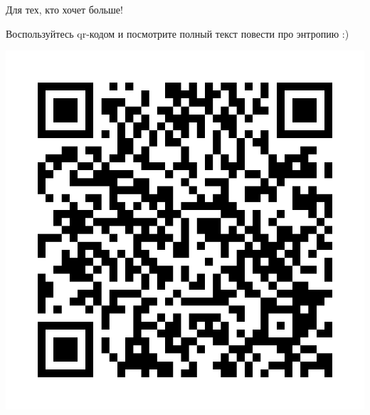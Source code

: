 \documentclass[final]{beamer}
\newlength{\onecolwid}
\begin{document}
\begin{frame}[t]
\begin{columns}[t]
\begin{column}{\onecolwid}





\begin{block}{Для тех, кто хочет больше!}

Воспользуйтесь qr-кодом и посмотрите полный текст повести про энтропию :)

\begin{center}
	\includegraphics[scale=0.3]{qrcode.png}
\end{center}

\end{block}


\end{column} %

\end{columns} %

\end{frame} %
\end{document}
